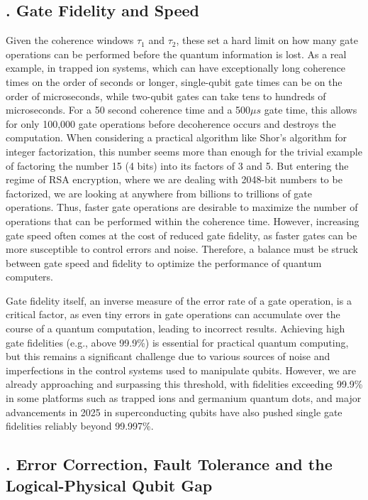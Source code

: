 \documentclass{elbioimp2}
\begin{document}
\subsection{. Gate Fidelity and Speed}
Given the coherence windows $\tau_1$ and $\tau_2$, these set a hard limit on how many gate operations can be performed before the quantum information is lost. As a real example, in trapped ion systems, which can have exceptionally long coherence times on the order of seconds or longer, single-qubit gate times can be on the order of microseconds, while two-qubit gates can take tens to hundreds of microseconds. For a 50 second coherence time and a 500$\mu s$ gate time, this allows for only 100,000 gate operations before decoherence occurs and destroys the computation. When considering a practical algorithm like Shor's algorithm for integer factorization, this number seems more than enough for the trivial example of factoring the number 15 (4 bits) into its factors of 3 and 5. But entering the regime of RSA encryption, where we are dealing with 2048-bit numbers to be factorized, we are looking at anywhere from billions to trillions of gate operations. Thus, faster gate operations are desirable to maximize the number of operations that can be performed within the coherence time. However, increasing gate speed often comes at the cost of reduced gate fidelity, as faster gates can be more susceptible to control errors and noise. Therefore, a balance must be struck between gate speed and fidelity to optimize the performance of quantum computers.

Gate fidelity itself, an inverse measure of the error rate of a gate operation, is a critical factor, as even tiny errors in gate operations can accumulate over the course of a quantum computation, leading to incorrect results. Achieving high gate fidelities (e.g., above 99.9\%) is essential for practical quantum computing, but this remains a significant challenge due to various sources of noise and imperfections in the control systems used to manipulate qubits. However, we are already approaching and surpassing this threshold, with fidelities exceeding 99.9\% in some platforms such as trapped ions and germanium quantum dots\cite{Srinivas_2021,gemanium999}, and major advancements in 2025 in superconducting qubits have also pushed single gate fidelities reliably beyond 99.997\%\cite{PRXQuantum.5.040342}.

\subsection{. Error Correction, Fault Tolerance and the Logical-Physical Qubit Gap}
\end{document}
